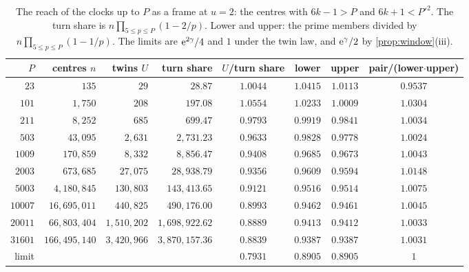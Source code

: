 \documentclass[11pt]{article}
\theoremstyle{definition}\newtheorem{definition}[theorem]{Definition}
\theoremstyle{remark}\newtheorem{remark}[theorem]{Remark}
\begin{document}
\begin{table}[t]\centering\small
\setlength{\tabcolsep}{4pt}
\begin{tabular}{@{}rrrrcccc@{}}\toprule
$P$ & centres $n$ & twins $U$ & turn share & $U$/turn share & lower & upper & pair/(lower$\cdot$upper)\\\midrule
$23$ & $135$ & $29$ & $28.87$ & $1.0044$ & $1.0415$ & $1.0113$ & $0.9537$\\
$101$ & $1{,}750$ & $208$ & $197.08$ & $1.0554$ & $1.0233$ & $1.0009$ & $1.0304$\\
$211$ & $8{,}252$ & $685$ & $699.47$ & $0.9793$ & $0.9919$ & $0.9841$ & $1.0034$\\
$503$ & $43{,}095$ & $2{,}631$ & $2{,}731.23$ & $0.9633$ & $0.9828$ & $0.9778$ & $1.0024$\\
$1009$ & $170{,}859$ & $8{,}332$ & $8{,}856.47$ & $0.9408$ & $0.9685$ & $0.9673$ & $1.0043$\\
$2003$ & $673{,}685$ & $27{,}075$ & $28{,}938.79$ & $0.9356$ & $0.9609$ & $0.9594$ & $1.0148$\\
$5003$ & $4{,}180{,}845$ & $130{,}803$ & $143{,}413.65$ & $0.9121$ & $0.9516$ & $0.9514$ & $1.0075$\\
$10007$ & $16{,}695{,}011$ & $440{,}825$ & $490{,}176.00$ & $0.8993$ & $0.9462$ & $0.9461$ & $1.0045$\\
$20011$ & $66{,}803{,}404$ & $1{,}510{,}202$ & $1{,}698{,}922.62$ & $0.8889$ & $0.9413$ & $0.9412$ & $1.0033$\\
$31601$ & $166{,}495{,}140$ & $3{,}420{,}966$ & $3{,}870{,}157.36$ & $0.8839$ & $0.9387$ & $0.9387$ & $1.0031$\\\midrule
limit & & & & $0.7931$ & $0.8905$ & $0.8905$ & $1$\\\bottomrule
\end{tabular}
\caption{The reach of the clocks up to $P$ as a frame at $u=2$: the centres with $6k-1>P$ and $6k+1<P'^2$. The turn share is $n\prod_{5\le p\le P}(1-2/p)$. Lower and upper: the prime members divided by $n\prod_{5\le p\le P}(1-1/p)$. The limits are $\mathrm e^{2\gamma}/4$ and $1$ under the twin law, and $\mathrm e^\gamma/2$ by \cref{prop:window}(iii).}
\label{tab:window}
\end{table}
\end{document}
